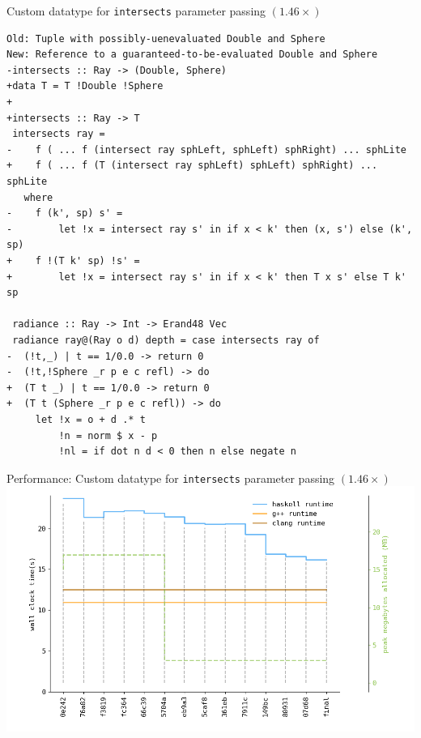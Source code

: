 \documentclass[8pt]{beamer}
\begin{document}
\begin{frame}[fragile]{Custom datatype for \texttt{intersects} parameter passing $(1.46\times)$}
\begin{verbatim}
Old: Tuple with possibly-uenevaluated Double and Sphere
New: Reference to a guaranteed-to-be-evaluated Double and Sphere
-intersects :: Ray -> (Double, Sphere)
+data T = T !Double !Sphere 
+
+intersects :: Ray -> T
 intersects ray =
-    f ( ... f (intersect ray sphLeft, sphLeft) sphRight) ... sphLite
+    f ( ... f (T (intersect ray sphLeft) sphLeft) sphRight) ... sphLite
   where
-    f (k', sp) s' = 
-        let !x = intersect ray s' in if x < k' then (x, s') else (k', sp)
+    f !(T k' sp) !s' =
+        let !x = intersect ray s' in if x < k' then T x s' else T k' sp
 
 radiance :: Ray -> Int -> Erand48 Vec
 radiance ray@(Ray o d) depth = case intersects ray of
-  (!t,_) | t == 1/0.0 -> return 0
-  (!t,!Sphere _r p e c refl) -> do
+  (T t _) | t == 1/0.0 -> return 0
+  (T t (Sphere _r p e c refl)) -> do
     let !x = o + d .* t
         !n = norm $ x - p
         !nl = if dot n d < 0 then n else negate n
\end{verbatim}


\end{frame}

\begin{frame}[fragile]{Performance: Custom datatype for \texttt{intersects} parameter passing $(1.46\times)$}
\includegraphics[height=0.6\textwidth]{perfdata-upto-07d68-gen.png}
\end{frame}
\end{document}
